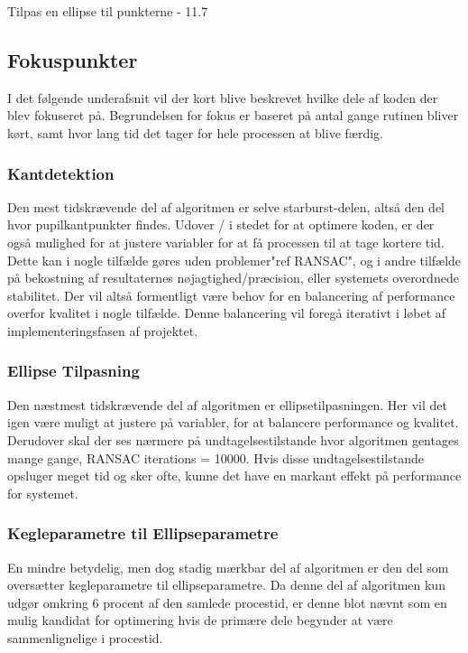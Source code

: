\documentclass[a4paper,oneside,12pt]{article}
\begin{document}
	Tilpas en ellipse til punkterne - 11.7%
	
	\subsection{Fokuspunkter}
	I det følgende underafsnit vil der kort blive beskrevet hvilke dele af koden der blev fokuseret på. Begrundelsen for fokus er baseret på antal gange rutinen bliver kørt, samt hvor lang tid det tager for hele processen at blive færdig.
	
	\subsubsection{Kantdetektion}
	Den mest tidskrævende del af algoritmen er selve starburst-delen, altså den del hvor pupilkantpunkter findes. Udover / i stedet for at optimere koden, er der også mulighed for at justere variabler for at få processen til at tage kortere tid. Dette kan i nogle tilfælde gøres uden problemer"ref RANSAC", og i andre tilfælde på bekostning af resultaternes nøjagtighed/præcision, eller systemets overordnede stabilitet. Der vil altså formentligt være behov for en balancering af performance overfor kvalitet i nogle tilfælde. Denne balancering vil foregå iterativt i løbet af implementeringsfasen af projektet.
	
	\subsubsection{Ellipse Tilpasning}
	Den næstmest tidskrævende del af algoritmen er ellipsetilpasningen. Her vil det igen være muligt at justere på variabler, for at balancere performance og kvalitet. Derudover skal der ses nærmere på undtagelsestilstande hvor algoritmen gentages mange gange, RANSAC iterations = 10000. Hvis disse undtagelsestilstande opsluger meget tid og sker ofte, kunne det have en markant effekt på performance for systemet.
	
	\subsubsection{Kegleparametre til Ellipseparametre}
	En mindre betydelig, men dog stadig mærkbar del af algoritmen er den del som oversætter kegleparametre til ellipseparametre. Da denne del af algoritmen kun udgør omkring 6 procent af den samlede procestid, er denne blot nævnt som en mulig kandidat for optimering hvis de primære dele begynder at være sammenlignelige i procestid. 
	
\end{document}
